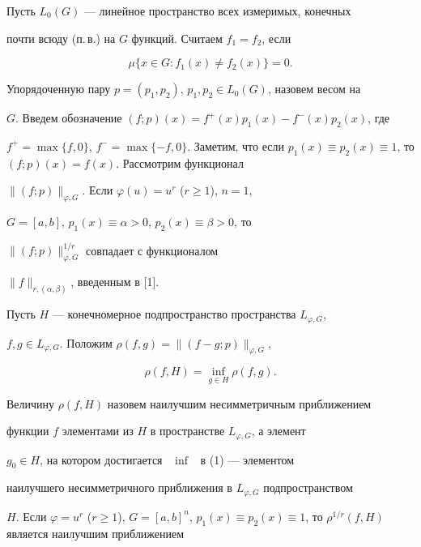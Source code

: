  


Пусть $L_0(G)$ --- линейное пространство всех измеримых, конечных 


почти всюду (п.\,в.) на $G$ функций. Считаем $f_1=f_2$, если 


$$ 


\mu\{x\in G:f_1(x)\ne f_2(x)\}=0. 


$$ 


 


Упорядоченную пару $p=(p_1,p_2)$, $p_1,p_2\in L_0(G)$, назовем весом на 


$G$. Введем обозначение $(f;p)(x)=f^+(x)p_1(x)-f^-(x)p_2(x)$, где 


$f^+=\max\{f,0\}$, $f^-=\max\{-f,0\}$. Заметим, что если $p_1(x)\equiv 


p_2(x)\equiv1$, то $(f;p)(x)=f(x)$. Рассмотрим функционал 


$\|(f;p)\|_{\varphi,G}$. Если $\varphi(u)=u^r$ ($r\ge1$), $n=1$, 


$G=[a,b]$, $p_1(x)\equiv\alpha>0$, $p_2(x)\equiv\beta>0$, то 


$\|(f;p)\|^{1/r}_{\varphi,G}$ совпадает с функционалом 


$\|f\|_{r,(\alpha,\beta)}$, введенным в [1]. 


 


Пусть $H$ --- конечномерное подпространство пространства $L_{\varphi,G}$, 


$f,g\in L_{\varphi,G}$. Положим $\rho(f,g)=\|(f-g;p)\|_{\varphi,G}$, 


\begin{equation} 


\rho(f,H)=\inf_{g\in H}\rho(f,g). 


\end{equation} 


 


Величину $\rho(f,H)$ назовем наилучшим несимметричным приближением 


функции $f$ элементами из $H$ в пространстве $L_{\varphi,G}$, а элемент 


$g_0\in H$, на котором достигается \ $\inf$ \ в (1) --- элементом 


наилучшего несимметричного приближения в $L_{\varphi,G}$ подпространством 


$H$. Если $\varphi=u^r$ ($r\ge1$), $G=[a,b]^n$, $p_1(x)\equiv 


p_2(x)\equiv1$, то $\rho^{1/r}(f,H)$ является наилучшим приближением 


